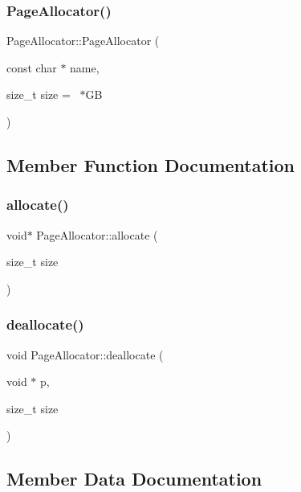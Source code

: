 \subsubsection{\texorpdfstring{PageAllocator()}{PageAllocator()}}
{\footnotesize\ttfamily Page\+Allocator\+::\+Page\+Allocator (\begin{DoxyParamCaption}\item[{const char $\ast$}]{name,  }\item[{size\+\_\+t}]{size = {~$\ast$GB} }\end{DoxyParamCaption})}



\subsection{Member Function Documentation}
\mbox{\label{class_page_allocator_aace2770352e13422515c4fa2dbdadd50}} 
\subsubsection{\texorpdfstring{allocate()}{allocate()}}
{\footnotesize\ttfamily void$\ast$ Page\+Allocator\+::allocate (\begin{DoxyParamCaption}\item[{size\+\_\+t}]{size }\end{DoxyParamCaption})}

\mbox{\label{class_page_allocator_ae3c05b01e61a8b5d3d18bde2a16dc7ab}} 
\subsubsection{\texorpdfstring{deallocate()}{deallocate()}}
{\footnotesize\ttfamily void Page\+Allocator\+::deallocate (\begin{DoxyParamCaption}\item[{void $\ast$}]{p,  }\item[{size\+\_\+t}]{size }\end{DoxyParamCaption})}



\subsection{Member Data Documentation}
\mbox{\label{class_page_allocator_a312706b7610cb7c5eca8f31fa79d1cf7}} 
